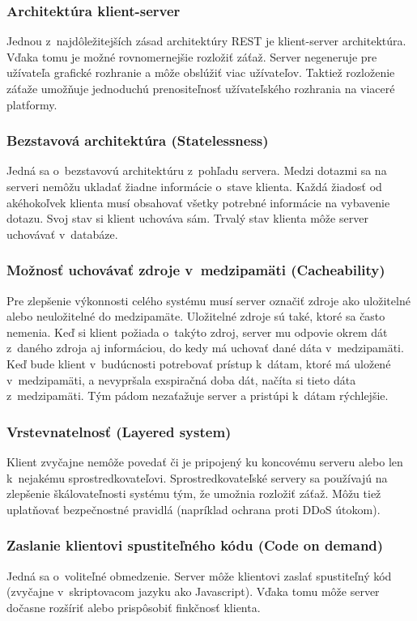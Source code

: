 \documentclass[zadani,slovak]{fitthesis}
\begin{document}
\subsubsection{Architektúra klient-server}
Jednou z~najdôležitejších zásad architektúry REST je klient-server architektúra. Vďaka tomu je možné rovnomernejšie rozložiť záťaž. Server negeneruje pre užívateľa grafické rozhranie a môže obslúžiť viac užívateľov. Taktiež rozloženie záťaže umožňuje jednoduchú prenositeľnosť užívateľského rozhrania na viaceré platformy.

\subsubsection{Bezstavová architektúra (Statelessness)}
Jedná sa o~bezstavovú architektúru z~pohľadu servera. Medzi dotazmi sa na serveri nemôžu ukladať žiadne informácie o~stave klienta. Každá žiadosť od akéhokoľvek klienta musí obsahovať všetky potrebné informácie na vybavenie dotazu. Svoj stav si klient uchováva sám. Trvalý stav klienta môže server uchovávať v~databáze.

\subsubsection{Možnosť uchovávať zdroje v~medzipamäti (Cacheability)}
Pre zlepšenie výkonnosti celého systému musí server označiť zdroje ako uložitelné alebo neuložitelné do medzipamäte. Uložitelné zdroje sú také, ktoré sa často nemenia. Keď si klient požiada o~takýto zdroj, server mu odpovie okrem dát z~daného zdroja aj informáciou, do kedy má uchovať dané dáta v~medzipamäti. Keď bude klient v~budúcnosti potrebovať prístup k~dátam, ktoré má uložené v~medzipamäti, a nevypršala exspiračná doba dát, načíta si tieto dáta z~medzipamäti. Tým pádom nezaťažuje server a pristúpi k~dátam rýchlejšie. 

\subsubsection{Vrstevnatelnosť (Layered system)}
Klient zvyčajne nemôže povedať či je pripojený ku koncovému serveru alebo len k~nejakému sprostredkovateľovi. Sprostredkovateľské servery sa používajú na zlepšenie škálovateľnosti systému tým, že umožnia rozložiť záťaž. Môžu tiež uplatňovať bezpečnostné pravidlá (napríklad ochrana proti DDoS útokom).

\subsubsection{Zaslanie klientovi spustiteľného kódu (Code on demand)}
Jedná sa o~voliteľné obmedzenie. Server môže klientovi zaslať spustiteľný kód (zvyčajne v~skriptovacom jazyku ako Javascript). Vďaka tomu môže server dočasne rozšíriť alebo prispôsobiť finkčnosť klienta.
\end{document}
